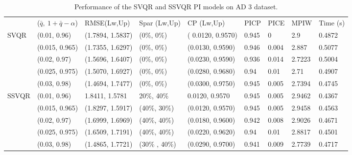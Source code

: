 \documentclass[10pt]{article} %
\begin{document}
\begin{table}
    {\fontsize{9}{9}\selectfont \begin{tabular}{|l|l|l|l|l|l|l|l|l|}
\cline{1-9}
        & ($\bar{q},~1+\bar{q}-\alpha$)               & RMSE(Lw,Up)   & Spar (Lw,Up)     & CP (Lw,Up)     & PICP  & PICE & MPIW   & Time (s) \\ \cline{1-9} 
\multirow{5}{*}{SVQR} & 
        (0.01, 0.96) & (1.7894, 1.5837) & (0\%, 0\%) &( 0.0120, 0.9570) & 0.945 & 0 & 2.9 & 0.4872 \\ 
       & (0.015, 0.965) & (1.7355, 1.6297) & (0\%, 0\%) & (0.0130, 0.9590) & 0.946 & 0.004 & 2.887 & 0.5077 \\ 
        & (0.02, 0.97) & (1.5696, 1.6407) & (0\%, 0\%) & (0.0230, 0.9590) & 0.936 & 0.014 & 2.7223 & 0.5004 \\ 
      &  (0.025, 0.975) & (1.5070, 1.6927) & (0\%, 0\%) & (0.0280, 0.9680) & 0.94 & 0.01 & 2.71 & 0.4907 \\ 
       & (0.03, 0.98) & (1.4694, 1.7477) & (0\%, 0\%) & (0.0300, 0.9750) & 0.945 & 0.005 & 2.7394 & 0.4745 \\ 
        \hline
   \multirow{5}{*}{SSVQR} &      (0.01, 0.96) & 1.8411, 1.5781 & 20\%, 40\% & 0.0120, 0.9570 & 0.945 & 0.005 & 2.9462 & 0.4367 \\ 
         & (0.015, 0.965) & (1.8297, 1.5917) & (40\%, 30\%)& (0.0120, 0.9570) & 0.945 & 0.005 & 2.9458 & 0.4563 \\ 
        & (0.02, 0.97) & (1.6999, 1.6969) & (40\%, 40\%) & (0.0180, 0.9600) & 0.942 & 0.008 & 2.9026 & 0.4671 \\ 
       & (0.025, 0.975) & (1.6509, 1.7191) & (40\%, 40\%) & (0.0220, 0.9620) & 0.94 & 0.01 & 2.8817 & 0.4501 \\ 
      &  (0.03, 0.98) & (1.4865, 1.7721) & (30\% , 40\%) & (0.0290, 0.9700) & 0.941 & 0.009 & 2.7739 & 0.4717 \\ \hline
    \end{tabular}}
      \caption{Performance of the SVQR and SSVQR PI models on AD 3 dataset.}
\label{AD3}
\end{table}
\end{document}

